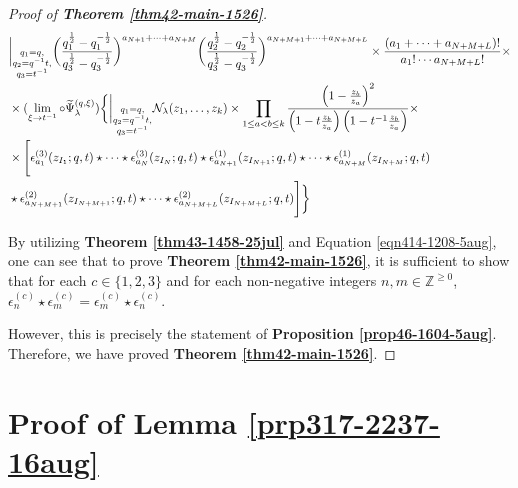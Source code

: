 \documentclass[12pt,reqno,a4paper]{amsart}
\newcommand{\comp}{\circ}
\newcommand{\cals}[1]{\mathcal{#1}}
\newcommand{\bb}[1]{\mathbb{#1}}
\numberwithin{equation}{section}
\newcommand{\dualmap}{
\widetilde{\Psi}^{(q,\xi)}_{\lambda}
}
\theoremstyle{definition}
\begin{document}
\begin{proof}[Proof of \textbf{Theorem \ref{thm42-main-1526}}]
\footnotesize
\begin{align}
	&
	\bigg|_{
		\substack{
			q_1 = q, \\
			q_2 = q^{-1}t,\\
			q_3 = t^{-1} \\
		}
	}
	\bigg(
	\frac{q_1^{\frac{1}{2}} - q_1^{-\frac{1}{2}}}{
		q_3^{\frac{1}{2}} - q_3^{-\frac{1}{2}}
	}
	\bigg)^{a_{N+1} + \cdots + a_{N+M}}
	\bigg(
	\frac{q_2^{\frac{1}{2}} - q_2^{-\frac{1}{2}}}{
		q_3^{\frac{1}{2}} - q_3^{-\frac{1}{2}}
	}
	\bigg)^{a_{N+M+1} + \cdots + a_{N+M+L}}
	\times 
	\frac{
		\left(	a_1 + \cdots + a_{N+M+L}	 \right) !
	}{
		a_1! \cdots a_{N+M+L} !
	} 
	\times 
	\label{eqn414-1208-5aug}
	\\
	&\times
	(\lim_{\xi \rightarrow t^{-1}} \comp \dualmap)
	\biggl\{
	\bigg|_{
		\substack{
			q_1 = q, \\
			q_2 = q^{-1}t,\\
			q_3 = t^{-1} \\
		}
	}
	\cals{N}_{\lambda}(z_1,\dots,z_k )
	\times 
	\prod_{1 \leq a < b \leq k}
	\frac{
		\left(1 - \frac{z_b}{z_a}\right)^2
	}{
		\left(1 - t\frac{z_b}{z_a}\right)
		\left(1 - t^{-1}\frac{z_b}{z_a}\right)
	}
	\times 
	\notag 
	\\
	&\times\Bigg[
	\epsilon^{(3)}_{a_1}(z_{I_1} ; q,t) \star \cdots \star \epsilon^{(3)}_{a_N}(z_{I_N} ; q,t)
	\star \epsilon^{(1)}_{a_{N+1}}(z_{I_{N+1}} ; q,t) \star \cdots \star \epsilon^{(1)}_{a_{N+M}}(z_{I_{N+M}} ; q,t)
	\notag 
	\\
	&\star \epsilon^{(2)}_{a_{N+M+1}}(z_{I_{N+M+1}} ; q,t) \star \cdots \star \epsilon^{(2)}_{a_{N+M+L}}(z_{I_{N+M+L}} ; q,t)
	\Bigg]
	\biggr\}
	\notag 
\end{align}
\normalsize

By utilizing \textbf{Theorem \ref{thm43-1458-25jul}} and Equation \eqref{eqn414-1208-5aug}, one can see that to prove \textbf{Theorem \ref{thm42-main-1526}}, it is sufficient to show that for each $c \in \{1,2,3\}$ and for each non-negative integers $n, m \in \bb{Z}^{\geq 0}$, $\epsilon^{(c)}_{n} \star \epsilon^{(c)}_{m} = \epsilon^{(c)}_{m} \star \epsilon^{(c)}_{n}$. 

However, this is precisely the statement of \textbf{Proposition \ref{prop46-1604-5aug}}. Therefore, we have proved \textbf{Theorem \ref{thm42-main-1526}}. 
\end{proof}




\appendix

\section{Proof of Lemma \ref{prp317-2237-16aug}}
\label{app-A-2246-16aug}
\end{document}
